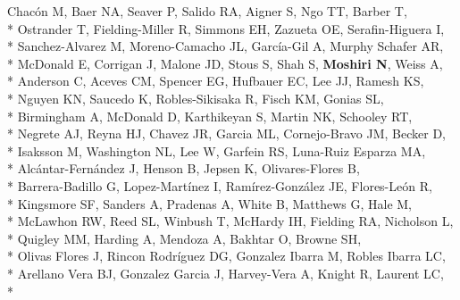 \documentclass[margin,line]{res}
\begin{document}
\begin{resume}
\hspace*{9mm} Chac\'{o}n M, Baer NA, Seaver P, Salido RA, Aigner S, Ngo TT, Barber T,\\*
\hspace*{9mm} Ostrander T, Fielding-Miller R, Simmons EH, Zazueta OE, Serafin-Higuera I,\\*
\hspace*{9mm} Sanchez-Alvarez M, Moreno-Camacho JL, García-Gil A, Murphy Schafer AR,\\*
\hspace*{9mm} McDonald E, Corrigan J, Malone JD, Stous S, Shah S, \textbf{Moshiri N}, Weiss A,\\*
\hspace*{9mm} Anderson C, Aceves CM, Spencer EG, Hufbauer EC, Lee JJ, Ramesh KS,\\*
\hspace*{9mm} Nguyen KN, Saucedo K, Robles-Sikisaka R, Fisch KM, Gonias SL,\\*
\hspace*{9mm} Birmingham A, McDonald D, Karthikeyan S, Martin NK, Schooley RT,\\*
\hspace*{9mm} Negrete AJ, Reyna HJ, Chavez JR, Garcia ML, Cornejo-Bravo JM, Becker D,\\*
\hspace*{9mm} Isaksson M, Washington NL, Lee W, Garfein RS, Luna-Ruiz Esparza MA,\\*
\hspace*{9mm} Alc\'{a}ntar-Fern\'{a}ndez J, Henson B, Jepsen K, Olivares-Flores B,\\*
\hspace*{9mm} Barrera-Badillo G, Lopez-Mart\'{i}nez I, Ram\'{i}rez-Gonz\'{a}lez JE, Flores-Le\'{o}n R,\\*
\hspace*{9mm} Kingsmore SF, Sanders A, Pradenas A, White B, Matthews G, Hale M,\\*
\hspace*{9mm} McLawhon RW, Reed SL, Winbush T, McHardy IH, Fielding RA, Nicholson L,\\*
\hspace*{9mm} Quigley MM, Harding A, Mendoza A, Bakhtar O, Browne SH,\\*
\hspace*{9mm} Olivas Flores J, Rincon Rodríguez DG, Gonzalez Ibarra M, Robles Ibarra LC,\\*
\hspace*{9mm} Arellano Vera BJ, Gonzalez Garcia J, Harvey-Vera A, Knight R, Laurent LC,\\*

\end{resume}
\end{document}
